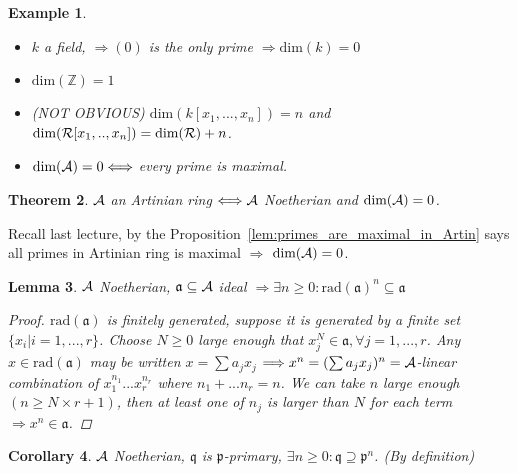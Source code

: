 \documentclass[11pt]{article}
\newtheorem{thm}{Theorem}[section]
\newtheorem{lemma}[thm]{Lemma}
\newtheorem{cor}[thm]{Corollary}
\newtheorem{ex}[thm]{Example}
\newcommand{\intg}{\mathbb Z}
\newcommand{\sca}{{\mathfrak a}}
\newcommand{\scp}{{\mathfrak p}}
\newcommand{\scq}{\mathfrak q}
\newcommand{\cala}{{\cal A}}
\newcommand{\calr}{{\cal R}}
\newcommand{\Lrta}{\Longrightarrow}
\newcommand{\Llrta}{\Longleftrightarrow}
\begin{document}
\begin{ex}\ 
\begin{itemize}
\item $k$ a field, $\Lrta (0)$ is the only prime $\Lrta \text{dim}(k)=0$
\item $\text{dim}(\intg)=1$
\item (NOT OBVIOUS) $\text{dim}(k[x_1,...,x_n])=n$
 and $\text{dim}(\calr[x_1,..,x_n])=\text{dim}(\calr)+n$.
\item $\text{dim}(\cala)=0\Llrta $ every prime is maximal.  
\end{itemize}
\end{ex}

\begin{thm}\label{thm:Artin_equiv_Noetherin+dim=0}
$\cala$ an Artinian   ring $\Llrta\cala$ Noetherian and $\text{dim}(\cala)=0$.  
\end{thm}
Recall last lecture, by the Proposition~\ref{lem:primes_are_maximal_in_Artin} says all primes in Artinian   ring is maximal $\Lrta$ $\text{dim}(\cala)=0$.

\begin{lemma}\label{lem:ideal_radical_Noetherian}
$\cala$ Noetherian, $\sca\subseteq \cala$ ideal $\Lrta \exists n\geq 0: \text{rad}(\sca)^n\subseteq \sca$
\begin{proof}
$\text{rad}(\sca)$ is finitely generated, suppose it is generated by a finite set $\{x_i|i=1,...,r\}$. Choose $N\geq 0$ large enough that $x_j^N\in\sca,\forall j=1,...,r$. Any $x\in \text{rad}(\sca)$ may be written $x=\sum a_j x_j$ $\Lrta x^n=(\sum a_j x_j)^n=\cala$-linear combination of $x_1^{n_1}...x_r^{n_r} $ where $n_1+...n_r=n$. We can take $n$ large enough $(n\geq N\times r+1)$, then at least one of $n_j$ is larger than $N$ for each term $\Lrta x^n\in\sca$.
\end{proof}
\end{lemma}

\begin{cor}
$\cala$ Noetherian, $\scq$  is $\scp$-primary, $\exists n\geq 0:\scq\supseteq \scp^n$. (By definition)
\end{cor}
\end{document}

